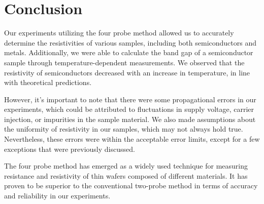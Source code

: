 \section{Conclusion}
	Our experiments utilizing the four probe method allowed us to accurately determine the resistivities of various samples, including both semiconductors and metals. Additionally, we were able to calculate the band gap of a semiconductor sample through temperature-dependent measurements. We observed that the resistivity of semiconductors decreased with an increase in temperature, in line with theoretical predictions.

	However, it's important to note that there were some propagational errors in our experiments, which could be attributed to fluctuations in supply voltage, carrier injection, or impurities in the sample material. We also made assumptions about the uniformity of resistivity in our samples, which may not always hold true. Nevertheless, these errors were within the acceptable error limits, except for a few exceptions that were previously discussed.

	The four probe method has emerged as a widely used technique for measuring resistance and resistivity of thin wafers composed of different materials. It has proven to be superior to the conventional two-probe method in terms of accuracy and reliability in our experiments.